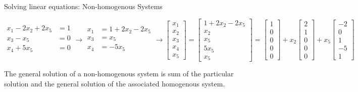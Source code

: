 \documentclass[aspectratio=169]{beamer}
\begin{document}
\begin{frame}[t]{Solving linear equations: Non-homogenous Systems}
\begin{scriptsize}
\[
\begin{split}
x_1 - 2x_2 + 2x_5 & = 1\\
x_3 - x_5 & = 0\\
x_4 + 5x_5 & = 0\\
\end{split} \longrightarrow
\begin{split}
x_1 &=  1 + 2x_2 - 2x_5\\
x_3 &=  x_5\\
x_4 &= -5x_5\\
\end{split} \longrightarrow
\begin{bmatrix}
x_1\\ x_2\\ x_3\\ x_4\\ x_5
\end{bmatrix} = \begin{bmatrix}
1 + 2x_2 - 2x_5\\ x_2\\ x_5\\ 5x_5\\ x_5
\end{bmatrix} = \begin{bmatrix}
1\\ 0\\ 0\\ 0\\ 0
\end{bmatrix} + x_2\begin{bmatrix}
2\\ 1\\ 0\\ 0\\ 0
\end{bmatrix} + x_5\begin{bmatrix}
-2\\ 0\\ 1\\ -5\\ 1
\end{bmatrix}
\]
\end{scriptsize}
\vspace{-0.3cm}

The general solution of a non-homogenous system is sum of the particular solution and the general solution of the associated homogenous system.
\end{frame}
\end{document}
